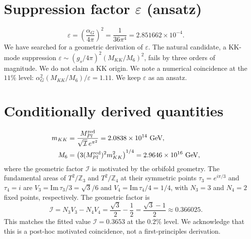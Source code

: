 \documentclass[12pt,a4paper]{article}
\numberwithin{equation}{section}
\begin{document}
\section{Suppression factor \(\varepsilon\) (ansatz)}
\begin{equation}
\varepsilon = \left(\frac{\alpha_G}{4\pi}\right)^2 = \frac{1}{36\pi^4} = 2.851662\times10^{-4}.
\end{equation}
We have searched for a geometric derivation of \(\varepsilon\). The natural candidate, a KK-mode suppression \(\varepsilon \sim (g_s/4\pi)^2 (M_{KK}/M_6)^2\), fails by three orders of magnitude. We do not claim a KK origin. We note a numerical coincidence at the \(11\%\) level: \(\alpha_G^2 (M_{KK}/M_6) / \varepsilon = 1.11\). We keep \(\varepsilon\) as an ansatz.

\section{Conditionally derived quantities}
\begin{align}
m_{KK} &= \frac{M_{Pl}^{\rm red}}{\sqrt{\mathcal{I}}\,e^{\pi^2}} = 2.0838\times10^{14}~\text{GeV}, \\
M_6 &= \left(3 (M_{Pl}^{\rm red})^2 m_{KK}^2\right)^{1/4} = 2.9646\times10^{16}~\text{GeV},
\end{align}
where the geometric factor \(\mathcal{I}\) is motivated by the orbifold geometry. The fundamental areas of \(T^2/\mathbb{Z}_3\) and \(T^2/\mathbb{Z}_4\) at their symmetric points \(\tau_3 = e^{i\pi/3}\) and \(\tau_4 = i\) are \(V_3 = \mathrm{Im}\,\tau_3/3 = \sqrt{3}/6\) and \(V_4 = \mathrm{Im}\,\tau_4/4 = 1/4\), with \(N_3 = 3\) and \(N_4 = 2\) fixed points, respectively. The geometric factor is
\begin{equation}
\mathcal{I} = N_3 V_3 - N_4 V_4 = \frac{\sqrt{3}}{2} - \frac{1}{2} = \frac{\sqrt{3}-1}{2} \approx 0.366025.
\end{equation}
This matches the fitted value \(\mathcal{I} = 0.3653\) at the \(0.2\%\) level. We acknowledge that this is a post-hoc motivated coincidence, not a first-principles derivation.
\end{document}
